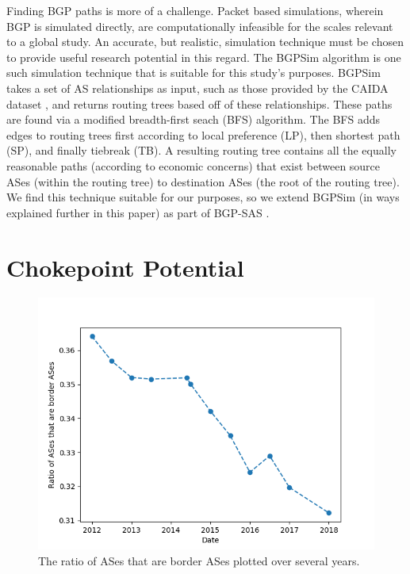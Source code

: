 \documentclass[10pt, conference, letterpaper]{IEEEtran}
\newcommand{\toolname}{BGP-SAS }
\begin{document}
\par Finding BGP paths is more of
a challenge. Packet based simulations, wherein BGP is simulated
directly, are computationally infeasible for the scales relevant to a
global study. An accurate, but realistic, simulation technique must be
chosen to provide useful research potential in this regard.  The
BGPSim algorithm \cite{quicksand} is one such simulation technique
that is suitable for this study's purposes. BGPSim takes a set of AS
relationships as input, such as those provided by the CAIDA dataset
\cite{CAIDA}, and returns routing trees based off of these
relationships. These paths are found via a modified breadth-first
seach (BFS) algorithm. The BFS adds edges to routing trees first
according to local preference (LP), then shortest path (SP), and
finally tiebreak (TB).  A resulting routing tree contains all the
equally reasonable paths (according to economic concerns) that exist
between source ASes (within the routing tree) to destination ASes (the
root of the routing tree). We find this technique suitable for our
purposes, so we extend BGPSim (in ways explained further in this
paper) as part of \toolname.

\section{Chokepoint Potential}


\begin{figure}
	\centering
	\includegraphics[width=\linewidth]{bnodes}
	\caption{The ratio of ASes that are border ASes plotted over several years.}\label{fig:bnodes}
\end{figure}
\end{document}
